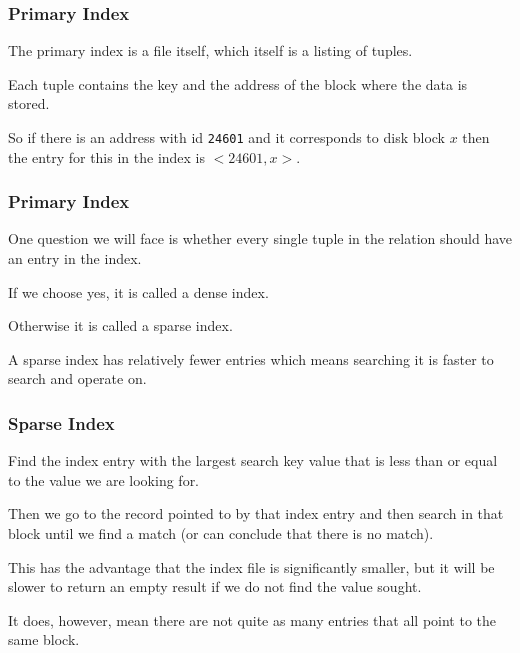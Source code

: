 \begin{frame}
\frametitle{Primary Index}

The primary index is a file itself, which itself is a listing of tuples. 

Each tuple contains the key and the address of the block where the data is stored. 

So if there is an address with id \texttt{24601} and it corresponds to disk block $x$ then the entry for this in the index is $<24601, x>$. 

\end{frame}

\begin{frame}
\frametitle{Primary Index}

One question we will face is whether every single tuple in the relation should have an entry in the index. 

If we choose yes, it is called a \alert{dense index}. 

Otherwise it is called a \alert{sparse index}. 

A sparse index has relatively fewer entries which means searching it is faster to search and operate on. 


\end{frame}

\begin{frame}
\frametitle{Sparse Index}

Find the index entry with the largest search key value that is less than or equal to the value we are looking for. 

Then we go to the record pointed to by that index entry and then search in that block until we find a match (or can conclude that there is no match). 

This has the advantage that the index file is significantly smaller, but it will be slower to return an empty result if we do not find the value sought.

It does, however, mean there are not quite as many entries that all point to the same block.

\end{frame}

